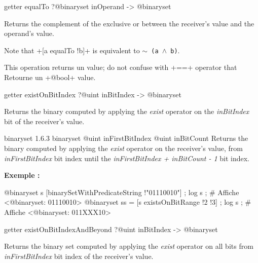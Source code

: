
\begin{galgascode}
getter equalTo ?@binaryset inOperand -> @binaryset
\end{galgascode}

Returns the complement of the exclusive or between the receiver's value and the operand's value.

Note that \ggs+[a equalTo !b]+ is equivalent to \texttt{$\sim$ (a $\wedge$ b)}.

This operation returns un  value; do not confuse with \ggs+==+ operator that Retourne un \ggs+@bool+ value.








\begin{galgascode}
getter existOnBitIndex ?@uint inBitIndex -> @binaryset
\end{galgascode}

Returns the binary computed by applying the \emph{exist} operator on the \emph{inBitIndex} bit of the receiver's value.







{binaryset}
{1.6.3}
{binaryset}
{@uint inFirstBitIndex}
{@uint inBitCount}
{Returns the binary computed by applying the \emph{exist} operator on the receiver's value, from \emph{inFirstBitIndex} bit index until the \emph{inFirstBitIndex + inBitCount - 1} bit index.}
{}


\textbf{Exemple :}
\begin{galgascode}
@binaryset s [binarySetWithPredicateString !"01110010"] ;
log s ; # Affiche <@binaryset: 01110010>
@binaryset ss = [s existsOnBitRange !2 !3] ;
log s ; # Affiche <@binaryset: 011XXX10>
\end{galgascode}








\begin{galgascode}
getter existOnBitIndexAndBeyond ?@uint inBitIndex -> @binaryset
\end{galgascode}

Returns the binary set computed by applying the \emph{exist} operator on all bits from \emph{inFirstBitIndex} bit index of the receiver's value.







